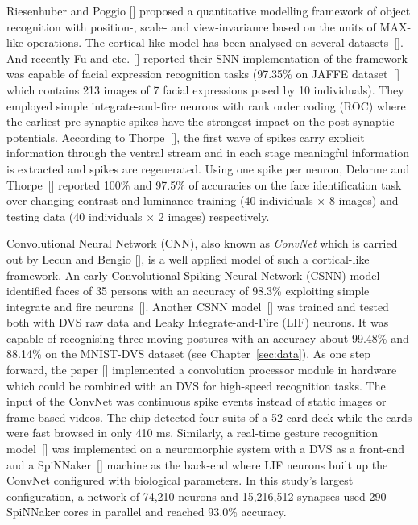 Riesenhuber and Poggio [\cite{riesenhuber1999hierarchical}] proposed a quantitative modelling framework of object recognition with position-, scale- and view-invariance based on the units of MAX-like operations.
The cortical-like model has been analysed on several datasets~[\cite{serre2007robust}].
And recently Fu and etc. [\cite{fu_spiking_2012}] reported their SNN implementation of the framework was capable of facial expression recognition tasks (97.35\% on JAFFE dataset~[\cite{lyons1998coding}] which contains 213 images of 7 facial expressions posed by 10 individuals).
They employed simple integrate-and-fire neurons with rank order coding (ROC) where  the earliest pre-synaptic spikes have the strongest impact on the post synaptic potentials.
According to Thorpe~[\cite{vanrullen_surfing_2002}], the first wave of spikes  carry explicit information through the ventral stream and in each stage meaningful information is extracted and spikes are regenerated. 
Using one spike per neuron, Delorme and Thorpe~[\cite{delorme_face_2001}] reported 100\% and 97.5\% of accuracies on the face identification task over changing  contrast and luminance training (40 individuals $\times$ 8 images) and testing data  (40 individuals $\times$ 2 images) respectively.

Convolutional Neural Network (CNN), also known as \textit{ConvNet} which is carried out by Lecun and Bengio [\cite{lecun1995convolutional}], is a well applied model of such a cortical-like framework.
An early Convolutional Spiking Neural Network (CSNN) model identified faces of 35 persons with an accuracy of 98.3\% exploiting simple integrate and fire neurons~[\cite{matsugu2002convolutional}].
Another CSNN model~[\cite{zhao_feedforward_2014}] was trained and tested both with DVS raw data and Leaky Integrate-and-Fire (LIF) neurons.
It was capable of recognising three moving postures with an accuracy about 99.48\% and 88.14\% on the MNIST-DVS dataset (see Chapter~\ref{sec:data}).
As one step forward, the paper [\cite{camunas2012event}] implemented a convolution processor module in hardware which could be combined with an DVS for high-speed recognition tasks.
The input of the ConvNet was continuous spike events instead of static images or frame-based videos. 
The chip detected four suits of a 52 card deck while the cards were fast browsed in only 410 ms.
Similarly, a real-time gesture recognition model~[\cite{liu2014real}] was implemented on a neuromorphic system with a DVS as a front-end and a SpiNNaker~[\cite{furber2013overview}] machine as the back-end where LIF neurons built up the ConvNet configured with biological parameters.
In this study's largest configuration, a network of 74,210 neurons and 15,216,512 synapses used 290 SpiNNaker cores in parallel and reached 93.0\% accuracy. 

